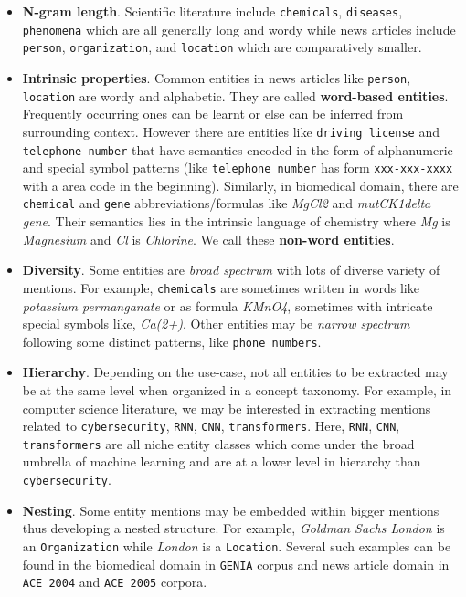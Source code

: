 \begin{itemize}
    \item \textbf{N-gram length}. Scientific literature include \texttt{chemicals}, \texttt{diseases}, \texttt{phenomena} which are all generally long and wordy while news articles include \texttt{person}, \texttt{organization}, and \texttt{location} which are comparatively smaller. 
    
    \item \textbf{Intrinsic properties}. Common entities in news articles like \texttt{person}, \texttt{location} are wordy and alphabetic. They are called \textbf{word-based entities}. Frequently occurring ones can be learnt or else can be inferred from surrounding context. However there are entities like \texttt{driving license} and \texttt{telephone number} that have semantics encoded in the form of alphanumeric and special symbol patterns (like \texttt{telephone number} has form \texttt{xxx-xxx-xxxx} with a area code in the beginning). Similarly, in biomedical domain, there are \texttt{chemical} and \texttt{gene} abbreviations/formulas like \textit{MgCl2} and \textit{mutCK1delta gene}. Their semantics lies in the intrinsic language of chemistry where \textit{Mg} is \textit{Magnesium} and \textit{Cl} is \textit{Chlorine}. We call these \textbf{non-word entities}.
    
    \item \textbf{Diversity}. Some entities are \textit{broad spectrum} with lots of diverse variety of mentions. For example, \texttt{chemicals} are sometimes written in words like \textit{potassium permanganate} or as formula \textit{KMnO4}, sometimes with intricate special symbols like, \textit{Ca(2+)}. Other entities may be \textit{narrow spectrum} following some distinct patterns, like \texttt{phone numbers}. 
    
    \item \textbf{Hierarchy}. Depending on the use-case, not all entities to be extracted may be at the same level when organized in a concept taxonomy. For example, in computer science literature, we may be interested in extracting mentions related to \texttt{cybersecurity}, \texttt{RNN}, \texttt{CNN}, \texttt{transformers}. Here, \texttt{RNN}, \texttt{CNN}, \texttt{transformers} are all niche entity classes which come under the broad umbrella of machine learning and are at a lower level in hierarchy than \texttt{cybersecurity}.
    
    \item \textbf{Nesting}. Some entity mentions may be embedded within bigger mentions thus developing a nested structure. For example, \textit{Goldman Sachs London} is an \texttt{Organization} while \textit{London} is a \texttt{Location}. Several such examples can be found in the biomedical domain in \texttt{GENIA} corpus\cite{kim2003genia} and news article domain in \texttt{ACE 2004}\cite{mitchell2005ace} and \texttt{ACE 2005}\cite{walker2006ace} corpora.
    

\end{itemize}
